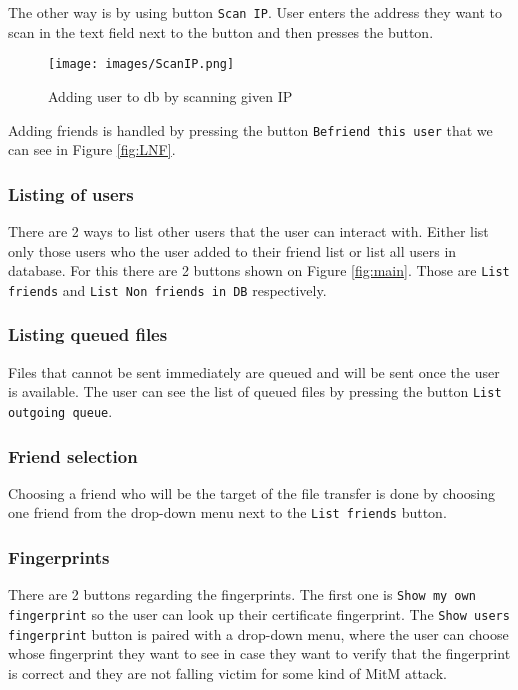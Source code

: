 The other way is by using button \texttt{Scan IP}. User enters the address they want to scan in the text field next to the button and then presses the button.
\begin{figure}[h]
    \centering
    \texttt{[image: images/ScanIP.png]}
    \caption{Adding user to db by scanning given IP}
    \label{fig:scanIP}
\end{figure}

Adding friends is handled by pressing the button \texttt{Befriend this user} that we can see in Figure \ref{fig:LNF}.

\subsubsection{Listing of users}
There are 2 ways to list other users that the user can interact with. Either list only those users who the user added to their friend list or list all users in database.
For this there are 2 buttons shown on Figure \ref{fig:main}. Those are \texttt{List friends} and \texttt{List Non friends in DB} respectively.

\subsubsection{Listing queued files}
Files that cannot be sent immediately are queued and will be sent once the user is available. The user can see the list of queued files by pressing the button 
\texttt{List outgoing queue}.\\

\subsubsection{Friend selection}
Choosing a friend who will be the target of the file transfer is done by choosing one friend from the drop-down menu next to the \texttt{List friends} button.\\

\subsubsection{Fingerprints}
There are 2 buttons regarding the fingerprints. The first one is \texttt{Show my own fingerprint} so the user can look up their certificate fingerprint. The \texttt{Show users fingerprint} button is paired with a drop-down menu, where the user can choose whose fingerprint they want to see in case they want to verify that the fingerprint is correct and they are not falling victim for some kind of MitM attack.\\
